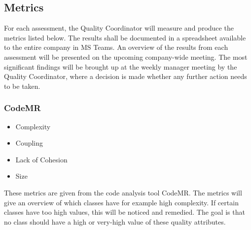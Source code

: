 
\subsection{Metrics}
For each assessment, the Quality Coordinator will measure and produce the metrics listed below. The results shall be documented in a spreadsheet available to the entire company in MS Teams. An overview of the results from each assessment will be presented on the upcoming company-wide meeting. The most significant findings will be brought up at the weekly manager meeting by the Quality Coordinator, where a decision is made whether any further action needs to be taken.

\subsubsection{CodeMR}
\begin{itemize}
    \item Complexity
    \item Coupling
    \item Lack of Cohesion
    \item Size
\end{itemize}
These metrics are given from the code analysis tool CodeMR. The metrics will give an overview of which classes have for example high complexity. If certain classes have too high values, this will be noticed and remedied. The goal is that no class should have a high or very-high value of these quality attributes.

